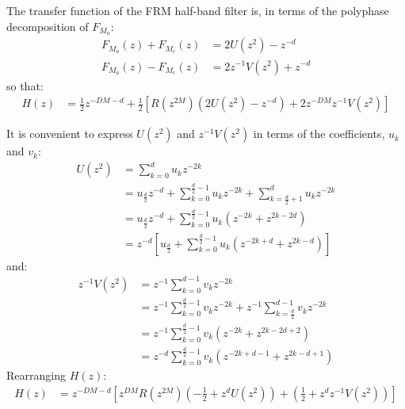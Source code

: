 \documentclass[a4paper,twoside,10pt,english]{report}
\begin{document}
The transfer function of the FRM half-band filter is, in terms of the
polyphase decomposition of $F_{M_{a}}$:
\begin{align*}
F_{M_{a}}\left(z\right)+F_{M_{c}}\left(z\right)&=2U\left(z^{2}\right)-z^{-d} \\
F_{M_{a}}\left(z\right)-F_{M_{c}}\left(z\right)&=2z^{-1}V\left(z^{2}\right)+z^{-d}
\end{align*}
so that:
\begin{align*}
H\left(z\right)&=\frac{1}{2}z^{-DM-d}+
\frac{1}{2}\left[R\left(z^{2M}\right)
\left(2U\left(z^{2}\right)-z^{-d}\right)+
2z^{-DM}z^{-1}V\left(z^{2}\right)
\right]
\end{align*}

It is convenient to express $U\left(z^{2}\right)$ and
$z^{-1}V\left(z^{2}\right)$ in terms of the coefficients, $u_{k}$ and $v_{k}$:
\begin{align*}
  U\left(z^{2}\right)&=\sum_{k=0}^{d}u_{k}z^{-2k}\\
                 &=u_{\frac{d}{2}}z^{-d}+
                   \sum_{k=0}^{\frac{d}{2}-1}u_{k}z^{-2k}+
                   \sum_{k=\frac{d}{2}+1}^{d}u_{k}z^{-2k}\\
                 &=u_{\frac{d}{2}}z^{-d}+
                   \sum_{k=0}^{\frac{d}{2}-1}u_{k}
                   \left(z^{-2k}+z^{2k-2d}\right)\\
                 &=z^{-d}\left[u_{\frac{d}{2}}+
                   \sum_{k=0}^{\frac{d}{2}-1}u_{k}
                   \left(z^{-2k+d}+z^{2k-d}\right)\right]
\end{align*}
and:
\begin{align*}
  z^{-1}V\left(z^{2}\right) &=z^{-1}\sum_{k=0}^{d-1}v_{k}z^{-2k}\\
                           &=z^{-1}\sum_{k=0}^{\frac{d}{2}-1}v_{k}z^{-2k}+
                             z^{-1}\sum_{k=\frac{d}{2}}^{d-1}v_{k}z^{-2k}\\
                           &=z^{-1}\sum_{k=0}^{\frac{d}{2}-1}v_{k}
                             \left(z^{-2k}+z^{2k-2d+2}\right)\\
                           &=z^{-d}\sum_{k=0}^{\frac{d}{2}-1}v_{k}
                             \left(z^{-2k+d-1}+z^{2k-d+1}\right)
\end{align*}
Rearranging $H\left(z\right)$:
\begin{align*}
  H\left(z\right)&=z^{-DM-d}\left[
                   z^{DM}R\left(z^{2M}\right)\left(-\frac{1}{2}+
                   z^{d}U\left(z^{2}\right)\right)+
                   \left(\frac{1}{2}+
                   z^{d}z^{-1}V\left(z^{2}\right)\right)\right]
\end{align*}
\end{document}
